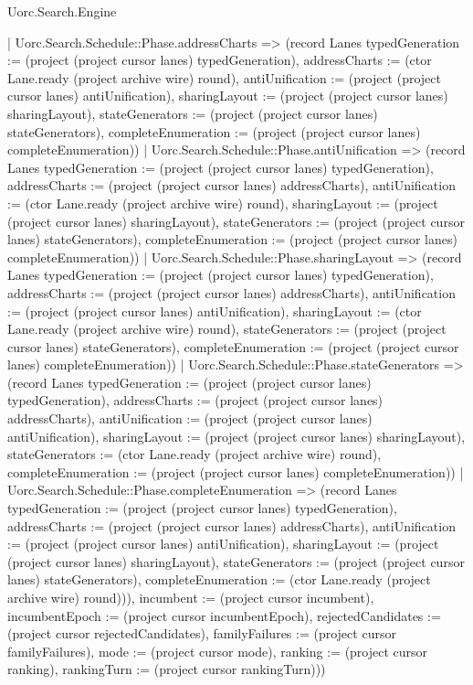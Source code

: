 \begin{lexlean}{Uorc.Search.Engine}
\begin{semanticmodule}
{{        | Uorc.Search.Schedule::Phase.addressCharts => (record Lanes {typedGeneration := (project (project cursor lanes) typedGeneration), addressCharts := (ctor Lane.ready (project archive wire) round), antiUnification := (project (project cursor lanes) antiUnification), sharingLayout := (project (project cursor lanes) sharingLayout), stateGenerators := (project (project cursor lanes) stateGenerators), completeEnumeration := (project (project cursor lanes) completeEnumeration)})
        | Uorc.Search.Schedule::Phase.antiUnification => (record Lanes {typedGeneration := (project (project cursor lanes) typedGeneration), addressCharts := (project (project cursor lanes) addressCharts), antiUnification := (ctor Lane.ready (project archive wire) round), sharingLayout := (project (project cursor lanes) sharingLayout), stateGenerators := (project (project cursor lanes) stateGenerators), completeEnumeration := (project (project cursor lanes) completeEnumeration)})
        | Uorc.Search.Schedule::Phase.sharingLayout => (record Lanes {typedGeneration := (project (project cursor lanes) typedGeneration), addressCharts := (project (project cursor lanes) addressCharts), antiUnification := (project (project cursor lanes) antiUnification), sharingLayout := (ctor Lane.ready (project archive wire) round), stateGenerators := (project (project cursor lanes) stateGenerators), completeEnumeration := (project (project cursor lanes) completeEnumeration)})
        | Uorc.Search.Schedule::Phase.stateGenerators => (record Lanes {typedGeneration := (project (project cursor lanes) typedGeneration), addressCharts := (project (project cursor lanes) addressCharts), antiUnification := (project (project cursor lanes) antiUnification), sharingLayout := (project (project cursor lanes) sharingLayout), stateGenerators := (ctor Lane.ready (project archive wire) round), completeEnumeration := (project (project cursor lanes) completeEnumeration)})
        | Uorc.Search.Schedule::Phase.completeEnumeration => (record Lanes {typedGeneration := (project (project cursor lanes) typedGeneration), addressCharts := (project (project cursor lanes) addressCharts), antiUnification := (project (project cursor lanes) antiUnification), sharingLayout := (project (project cursor lanes) sharingLayout), stateGenerators := (project (project cursor lanes) stateGenerators), completeEnumeration := (ctor Lane.ready (project archive wire) round)})), incumbent := (project cursor incumbent), incumbentEpoch := (project cursor incumbentEpoch), rejectedCandidates := (project cursor rejectedCandidates), familyFailures := (project cursor familyFailures), mode := (project cursor mode), ranking := (project cursor ranking), rankingTurn := (project cursor rankingTurn)}))
}
\end{semanticmodule}
\end{lexlean}
